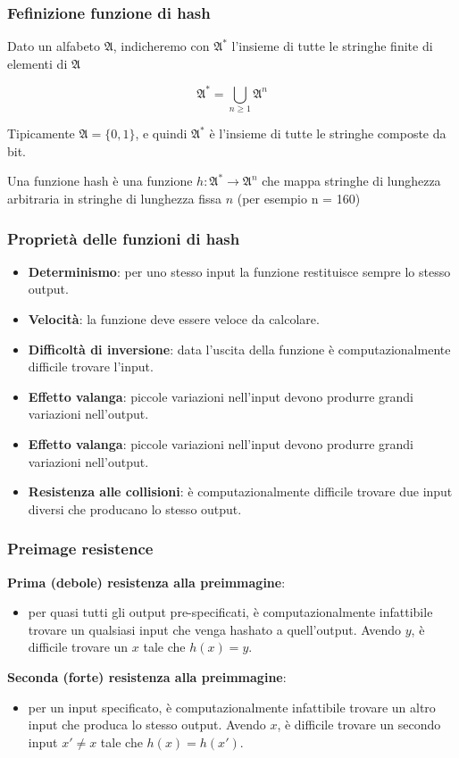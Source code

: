 \begin{frame}
	\frametitle{Fefinizione funzione di hash}

	Dato un alfabeto $\mathfrak{A}$, indicheremo con $\mathfrak{A}^*$ l’insieme di tutte le stringhe finite di elementi di $\mathfrak{A}$

	\[
		\mathfrak{A}^* = \bigcup_{n \geq 1} \mathfrak{A}^n
	\]

	Tipicamente $\mathfrak{A} = \{0, 1\}$, e quindi $\mathfrak{A}^*$ è l’insieme di tutte le stringhe composte da bit.

	\vspace{1cm}
	Una funzione hash è una funzione $h : \mathfrak{A}^* \rightarrow \mathfrak{A}^n$ che mappa stringhe di lunghezza arbitraria in stringhe di lunghezza fissa $n$ (per esempio n = 160)

\end{frame}


\begin{frame}
	\frametitle{Proprietà delle funzioni di hash}

	\begin{itemize}
		\item \textbf{Determinismo}: per uno stesso input la funzione restituisce sempre lo stesso output.
		\item \textbf{Velocità}: la funzione deve essere veloce da calcolare.
		\item \textbf{Difficoltà di inversione}: data l'uscita della funzione è computazionalmente difficile trovare l'input.
		\item \textbf{Effetto valanga}: piccole variazioni nell'input devono produrre grandi variazioni nell'output.
		\item \textbf{Effetto valanga}: piccole variazioni nell'input devono produrre grandi variazioni nell'output.
		\item \textbf{Resistenza alle collisioni}: è computazionalmente difficile trovare due input diversi che producano lo stesso output.
	\end{itemize}
\end{frame}

\begin{frame}
	\frametitle{Preimage resistence}
	\textbf{Prima (debole) resistenza alla preimmagine}:
	\begin{itemize}
		\item per quasi tutti gli output pre-specificati, è computazionalmente infattibile trovare un qualsiasi input che venga hashato a quell'output.
		      Avendo \( y \), è difficile trovare un \( x \) tale che \( h(x) = y \).
	\end{itemize}
	\textbf{Seconda (forte) resistenza alla preimmagine}:
	\begin{itemize}
		\item per un input specificato, è computazionalmente infattibile trovare un altro input che produca lo stesso output.
		      Avendo \( x \), è difficile trovare un secondo input \( x' \neq x \) tale che \( h(x) = h(x') \).
	\end{itemize}

\end{frame}

